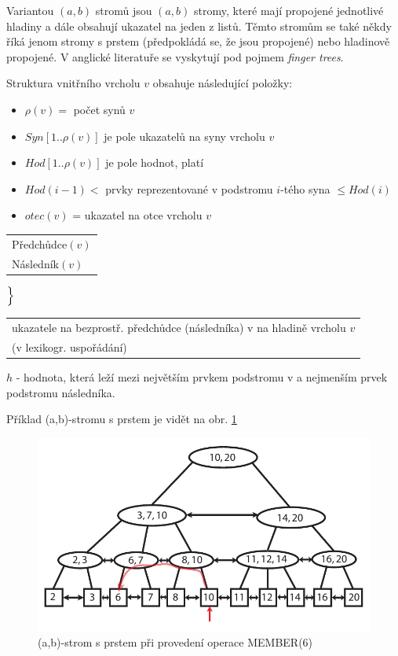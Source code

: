 Variantou $(a,b)$ stromů jsou $(a,b)$ stromy, které mají propojené
jednotlivé hladiny a dále obsahují ukazatel na jeden z listů.
Těmto stromům se také někdy říká jenom stromy s prstem (předpokládá se, že
jsou propojené) nebo hladinově propojené. V anglické literatuře se
vyskytují pod pojmem \emph{finger trees}.
\par
Struktura vnitřního vrcholu $v$ obsahuje následující položky: 
\begin{itemize}
\item $\rho(v) =$ počet synů $v$ 
\item $Syn[1..\rho(v)]$ je pole ukazatelů na syny vrcholu $v$
\item $Hod[1..\rho(v)]$ je pole hodnot, platí 
\item $Hod(i-1) <$ prvky reprezentované v podstromu $i$-tého syna $\leq Hod(i)$ 
\item $otec(v)$ = ukazatel na otce vrcholu $v$
\end{itemize}

\begin{tabular}{l}
Předchůdce$(v)$ \\
Následník$(v)$
\end{tabular}
$\Bigl\}$
\begin{tabular}{l}
ukazatele na bezprostř. předchůdce (následníka) v na hladině vrcholu $v$ \\
(v lexikogr. uspořádání)
\end{tabular}
\par

$h$ - hodnota, která leží mezi největším prvkem podstromu v a nejmenším
prvek podstromu následníka.

Příklad (a,b)-stromu s prstem je vidět na obr. \ref{fig.abtree.finger}

\begin{figure}[!htb]
\centering\includegraphics{pics/abtree-finger}
\caption{(a,b)-strom s prstem při provedení operace MEMBER(6)} 
\label{fig.abtree.finger}
\end{figure} 

